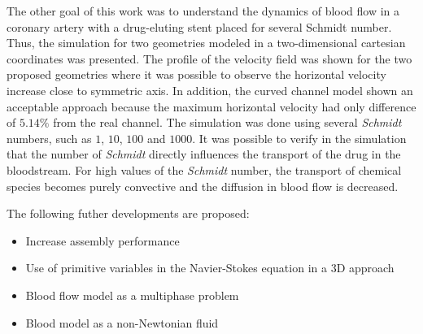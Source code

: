 \medskip
The other goal of this work was to understand the dynamics of blood 
flow in a coronary artery with 
a drug-eluting stent placed for several Schmidt number. Thus, the simulation for two geometries 
modeled in a two-dimensional cartesian coordinates was presented. 
The profile of the velocity field was shown for the two proposed 
geometries where it was possible to observe the horizontal
velocity increase close to symmetric axis. In addition,
the curved channel model shown an acceptable approach because
the maximum horizontal velocity had only difference of $5.14\%$ 
from the real channel.  
The simulation was done using several \textit{Schmidt} numbers, 
such as $1$, $10$, $100$ and $1000$. It was possible to verify in the 
simulation that the number of \textit{Schmidt} directly influences 
the transport of the drug in the bloodstream. For high values of 
the \textit{Schmidt} number, the transport of chemical species 
becomes purely convective and the diffusion in blood flow is decreased. 

\vspace{0.7cm}
\noindent
The following futher developments are proposed:

\begin{itemize}
 \vspace{-0.3cm}
 \item Increase assembly performance

 \item Use of primitive variables in the Navier-Stokes equation in a 3D approach
 
 \item Blood flow model as a multiphase problem

 \item Blood model as a non-Newtonian fluid
\end{itemize}








